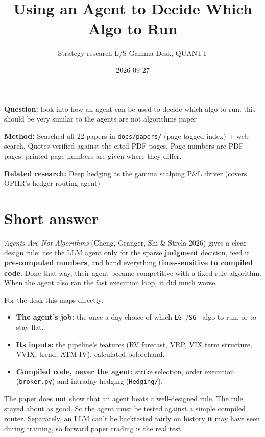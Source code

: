 \documentclass{article}
\title{Using an Agent to Decide Which Algo to Run}
\author{Strategy research \textperiodcentered{} L/S Gamma Desk, QUANTT}
\date{2026-09-27}
\begin{document}
\maketitle

\textbf{Question:} look into how an agent can be used to decide which algo to run. this should be very similar to the agents are not algorithms paper

\textbf{Method:} Searched all 22 papers in \texttt{docs/\allowbreak{}papers/\allowbreak{}} (page-tagged index) + web search. Quotes verified against the cited PDF pages. Page numbers are PDF pages; printed page numbers are given where they differ.

\textbf{Related research:} \href{2026-09-27-deep-hedging-as-gamma-scalping-pnl-driver.pdf}{Deep hedging as the gamma scalping P\&L driver} (covers OPHR's hedger-routing agent)

\section{Short answer}

\emph{Agents Are Not Algorithms} (Cheng, Granger, Shi \& Strela 2026) gives a clear design rule: use the LLM agent only for the sparse \textbf{judgment} decision, feed it \textbf{pre-computed numbers}, and hand everything \textbf{time-sensitive to compiled code}. Done that way, their agent became competitive with a fixed-rule algorithm. When the agent also ran the fast execution loop, it did much worse.

For the desk this maps directly:

\begin{itemize}

\item \textbf{The agent's job:} the once-a-day choice of which \texttt{LG\_\allowbreak{}}/\allowbreak{}\texttt{SG\_\allowbreak{}} algo to run, or to stay flat.

\item \textbf{Its inputs:} the pipeline's features (RV forecast, VRP, VIX term structure, VVIX, trend, ATM IV), calculated beforehand.

\item \textbf{Compiled code, never the agent:} strike selection, order execution (\texttt{broker.\allowbreak{}py}) and intraday hedging (\texttt{Hedging/\allowbreak{}}).

\end{itemize}

The paper does \textbf{not} show that an agent beats a well-designed rule. The rule stayed about as good. So the agent must be tested against a simple compiled router. Separately, an LLM can't be backtested fairly on history it may have seen during training, so forward paper trading is the real test.
\end{document}
